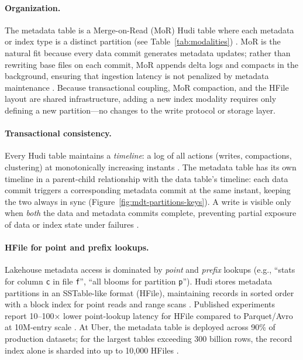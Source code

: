 \documentclass[sigconf]{acmart}
\begin{document}
\paragraph{Organization.}
The metadata table is a Merge-on-Read (MoR) Hudi table where each metadata or index type is a distinct partition (see Table~\ref{tab:modalities}) \cite{hudi-metadata,hudi-indexes}.
MoR is the natural fit because every data commit generates metadata updates; rather than rewriting base files on each commit, MoR appends delta logs and compacts in the background, ensuring that ingestion latency is not penalized by metadata maintenance \cite{hudi-metadata}.
Because transactional coupling, MoR compaction, and the HFile layout are shared infrastructure, adding a new index modality requires only defining a new partition---no changes to the write protocol or storage layer.

\paragraph{Transactional consistency.}
Every Hudi table maintains a \emph{timeline}: a log of all actions
(writes, compactions, clustering) at monotonically increasing instants
\cite{hudi-metadata}.
The metadata table has its own timeline in a parent-child relationship
with the data table's timeline: each data commit triggers a corresponding
metadata commit at the same instant, keeping the two always in sync
(Figure~\ref{fig:mdt-partitions-keys}).
A write is visible only when \emph{both} the data and metadata commits
complete, preventing partial exposure of data or index state under
failures \cite{onehouse-mmi}.

\paragraph{HFile for point and prefix lookups.}
Lakehouse metadata access is dominated by \emph{point} and \emph{prefix} lookups (e.g., ``stats for column \texttt{c} in file \texttt{f}'', ``all blooms for partition \texttt{p}'').
Hudi stores metadata partitions in an SSTable-like format (HFile), maintaining records in sorted order with a block index for point reads and range scans \cite{hudi-techspec}.
Published experiments report 10--100$\times$ lower point-lookup latency for HFile compared to Parquet/Avro at 10M-entry scale \cite{onehouse-mmi}.
At Uber, the metadata table is deployed across 90\% of production datasets; for the largest tables exceeding 300 billion rows, the record index alone is sharded into up to 10,000 HFiles \cite{uber-hudi-blog}.
\end{document}
